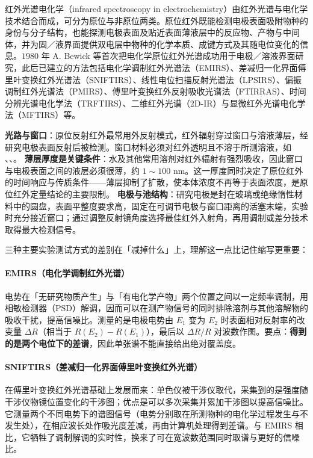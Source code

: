红外光谱电化学（infrared spectroscopy in electrochemistry）由红外光谱与电化学技术结合而成，可分为原位与非原位两类。原位红外既能检测电极表面吸附物种的身份与分子结构，也能探测电极表面及贴近表面薄液层中的反应物、产物与中间体，并为固／液界面提供双电层中物种的化学本质、成键方式及其随电位变化的信息。$1980$ 年 A. Bewick 等首次把电化学原位红外光谱成功用于电极／溶液界面研究，此后已建立的方法包括电化学调制红外光谱法（EMIRS）、差减归一化界面傅里叶变换红外光谱法（SNIFTIRS）、线性电位扫描反射光谱法（LPSIRS）、偏振调制红外光谱法（PMIRS）、傅里叶变换红外反射吸收光谱法（FTIRRAS）、时间分辨光谱电化学法（TRFTIRS）、二维红外光谱（2D-IR）与显微红外光谱电化学法（MFTIRS）等。

\begin{measure}
 \textbf{光路与窗口}：原位反射红外最常用外反射模式，红外辐射穿过窗口与溶液薄层，经研究电极表面反射后被检测。窗口材料必须对红外透明且不溶于所测溶液，如 、、。
 \textbf{薄层厚度是关键条件}：水及其他常用溶剂对红外辐射有强烈吸收，因此窗口与电极表面之间的液层必须很薄，约 $1\sim100$ nm。这一厚度同时决定了原位红外的时间响应与传质条件——薄层抑制了扩散，使本体浓度不再等于表面浓度，是原位红外定量结论的主要限制。
 \textbf{电极与池结构}：研究电极是封在玻璃或绝缘惰性材料中的圆盘，表面平整度要求高，固定在可调节电极与窗口距离的活塞末端，实验时充分接近窗口；通过调整反射镜角度选择最佳红外入射角，再用调制或差分技术取得最大检测信号。
\end{measure}

三种主要实验测试方式的差别在「减掉什么」上，理解这一点比记住缩写更重要：

\paragraph{EMIRS（电化学调制红外光谱）}
电势在「无研究物质产生」与「有电化学产物」两个位置之间以一定频率调制，用相敏检测器（PSD）解调，因而可以在测产物信号的同时排除溶剂与其他溶解物的吸收干扰，提高信噪比。测量的是电极电势由 $E_{1}$ 变为 $E_{2}$ 时表面相对反射率的改变量 $\Delta R$（相当于 $R(E_{2})-R(E_{1})$），最后以 $\Delta R/R$ 对波数作图。要点：\textbf{得到的是两个电位下的差谱}，因此单张谱不能直接给出绝对覆盖度。

\paragraph{SNIFTIRS（差减归一化界面傅里叶变换红外光谱）}
在傅里叶变换红外光谱基础上发展而来：单色仪被干涉仪取代，采集到的是强度随干涉仪物镜位置变化的干涉图；优点是可以多次采集并累加干涉图以提高信噪比。它测量两个不同电势下的谱图信号（电势分别取在所测物种的电化学过程发生与不发生处），在相应波长处作吸光度差减，再由计算机处理得到差谱。与 EMIRS 相比，它牺牲了调制解调的实时性，换来了可在宽波数范围同时取谱与更好的信噪比。

